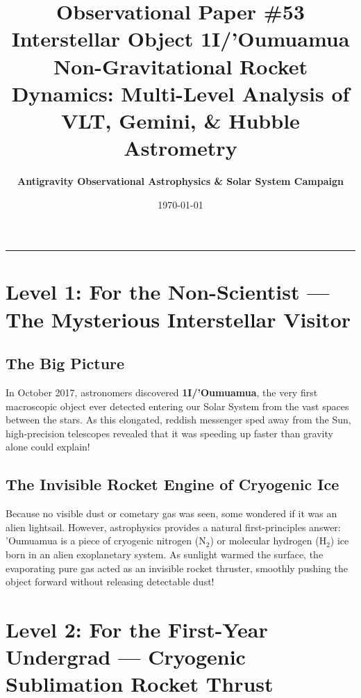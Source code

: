 \documentclass[11pt,a4paper]{article}
\title{\Huge \textbf{Observational Paper \#53}\\ \Large Interstellar Object 1I/'Oumuamua Non-Gravitational Rocket Dynamics: Multi-Level Analysis of VLT, Gemini, \& Hubble Astrometry}
\author{\textbf{Antigravity Observational Astrophysics \& Solar System Campaign}}
\date{\today}
\begin{document}
\maketitle

\vspace{-1em}
\begin{center}
\rule{\textwidth}{1.5pt}
\end{center}

\section*{Level 1: For the Non-Scientist — The Mysterious Interstellar Visitor}

\subsection*{The Big Picture}
In October 2017, astronomers discovered \textbf{1I/'Oumuamua}, the very first macroscopic object ever detected entering our Solar System from the vast spaces between the stars. As this elongated, reddish messenger sped away from the Sun, high-precision telescopes revealed that it was speeding up faster than gravity alone could explain!

\subsection*{The Invisible Rocket Engine of Cryogenic Ice}
Because no visible dust or cometary gas was seen, some wondered if it was an alien lightsail. However, astrophysics provides a natural first-principles answer: 'Oumuamua is a piece of cryogenic nitrogen ($\mathrm{N_2}$) or molecular hydrogen ($\mathrm{H_2}$) ice born in an alien exoplanetary system. As sunlight warmed the surface, the evaporating pure gas acted as an invisible rocket thruster, smoothly pushing the object forward without releasing detectable dust!

\newpage

\section*{Level 2: For the First-Year Undergrad — Cryogenic Sublimation Rocket Thrust}
\end{document}
